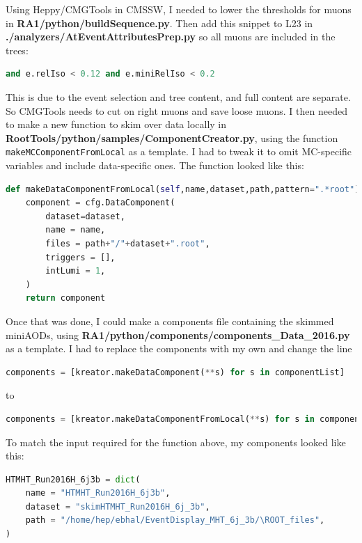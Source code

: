 Using Heppy/CMGTools in CMSSW, I needed to lower the thresholds for muons in \textbf{RA1/python/buildSequence.py}. Then add this snippet to L23 in \textbf{./analyzers/AtEventAttributesPrep.py} so all muons are included in the trees:

\begin{lstlisting}[belowskip=-0.7cm, language=python, numbers=none]
and e.relIso < 0.12 and e.miniRelIso < 0.2
\end{lstlisting}

This is due to the event selection and tree content, and full content are separate. So CMGTools needs to cut on right muons and save loose muons. I then needed to make a new function to skim over data locally in \textbf{RootTools/python/samples/ComponentCreator.py}, using the function \texttt{makeMCComponentFromLocal} as a template. I had to tweak it to omit MC-specific variables and include data-specific ones. The function looked like this:

\begin{lstlisting}[belowskip=-0.7cm, language=python, numbers=none]
def makeDataComponentFromLocal(self,name,dataset,path,pattern=".*root"):
    component = cfg.DataComponent(
        dataset=dataset,
        name = name,
        files = path+"/"+dataset+".root",
        triggers = [],
        intLumi = 1,
    )
    return component
\end{lstlisting}

Once that was done, I could make a components file containing the skimmed miniAODs, using \textbf{RA1/python/components/components\_Data\_2016.py} as a template. I had to replace the components with my own and change the line

\begin{lstlisting}[belowskip=-0.7cm, language=python, numbers=none]
components = [kreator.makeDataComponent(**s) for s in componentList]
\end{lstlisting}

to

\begin{lstlisting}[belowskip=-0.7cm, language=python, numbers=none]
components = [kreator.makeDataComponentFromLocal(**s) for s in componentList]
\end{lstlisting}

To match the input required for the function above, my components looked like this:

\begin{lstlisting}[belowskip=-0.7cm, language=python, numbers=none]
HTMHT_Run2016H_6j3b = dict(
    name = "HTMHT_Run2016H_6j3b",
    dataset = "skimHTMHT_Run2016H_6j_3b",
    path = "/home/hep/ebhal/EventDisplay_MHT_6j_3b/\ROOT_files",                                                                                                                                 
)
\end{lstlisting}

